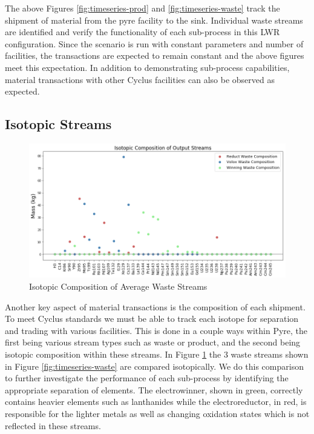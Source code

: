 The above Figures \ref{fig:timeseries-prod} and \ref{fig:timeseries-waste} track the shipment of material from the pyre facility to the sink.
Individual waste streams are identified and verify the functionality of each sub-process in this LWR configuration. Since the scenario is run with
constant parameters and number of facilities, the transactions are expected to remain constant and the above figures meet this expectation.
In addition to demonstrating sub-process capabilities, material transactions with other Cyclus facilities can also be observed as expected.

\subsection{Isotopic Streams}
\begin{figure} [h]
	\includegraphics[width=\linewidth]{images/avg-isotope-comp}
	\caption{Isotopic Composition of Average Waste Streams}
	\label{fig:avg-isotope-comp}
\end{figure}

Another key aspect of material transactions is the composition of each shipment. To meet Cyclus standards we must be able to track each isotope for
separation and trading with various facilities. This is done in a couple ways within Pyre, the first being various stream types such as waste or product,
and the second being isotopic composition within these streams. In Figure \ref{fig:avg-isotope-comp} the 3 waste streams shown in Figure \ref{fig:timeseries-waste}
are compared isotopically. We do this comparison to further investigate the performance of each sub-process by identifying the appropriate separation of elements.
The electrowinner, shown in green, correctly contains heavier elements such as lanthanides while the electroreductor, in red, is responsible for the lighter metals
as well as changing oxidation states which is not reflected in these streams.

